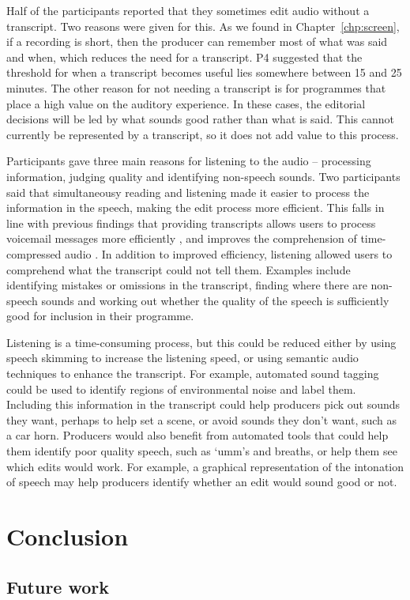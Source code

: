 Half of the participants reported that they sometimes edit audio without a transcript. Two reasons were given for
this. As we found in Chapter~\ref{chp:screen}, if a recording is short, then the producer can remember most of what was
said and when, which reduces the need for a transcript. P4 suggested that the threshold for when a transcript becomes
useful lies somewhere between 15 and 25 minutes. The other reason for not needing a transcript is for programmes that
place a high value on the auditory experience. In these cases, the editorial decisions will be led by what sounds good
rather than what is said. This cannot currently be represented by a transcript, so it does not add value to this
process.

Participants gave three main reasons for listening to the audio -- processing information, judging quality and
identifying non-speech sounds. Two participants said that simultaneousy reading and listening made it easier to process
the information in the speech, making the edit process more efficient. This falls in line with previous findings that
providing transcripts allows users to process voicemail messages more efficiently \citep{Whittaker2002}, and improves
the comprehension of time-compressed audio \citep{Vemuri2004}. In addition to improved efficiency, listening allowed
users to comprehend what the transcript could not tell them. Examples include identifying mistakes or omissions in the
transcript, finding where there are non-speech sounds and working out whether the quality of the speech is sufficiently
good for inclusion in their programme.

Listening is a time-consuming process, but this could be reduced either by using speech skimming \citep{Arons1997} to
increase the listening speed, or using semantic audio techniques to enhance the transcript. For example, automated
sound tagging \citep{Duan2014} could be used to identify regions of environmental noise and label them. Including this
information in the transcript could help producers pick out sounds they want, perhaps to help set a scene, or avoid
sounds they don't want, such as a car horn. Producers would also benefit from automated tools that could help them
identify poor quality speech, such as `umm's and breaths, or help them see which edits would work.  For example, a
graphical representation of the intonation of speech may help producers identify whether an edit would sound good or
not.

\section{Conclusion}\label{sec:paper-conclusion}

\subsection{Future work}


